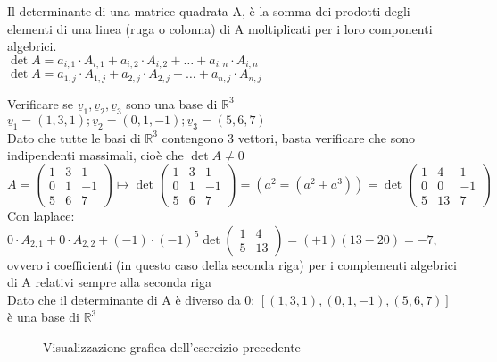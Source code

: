 \begin{teorema}
	Il determinante di una matrice quadrata A, è la somma dei prodotti degli elementi di una linea (ruga o colonna) di A moltiplicati per i loro componenti algebrici.\\
	$\det A=a_{i,1}\cdot A_{i,1}+a_{i,2}\cdot A_{i,2}+\dots+a_{i,n}\cdot A_{i,n}$\\
	$\det A=a_{1,j}\cdot A_{1,j}+a_{2,j}\cdot A_{2,j}+\dots+a_{n,j}\cdot A_{n,j}$
\end{teorema}

\begin{esercizio}
	Verificare se $\underline{v}_1,\underline{v}_2,\underline{v}_3$ sono una base di $\mathbb{R}^3$\\
	$\underline{v}_1=(1,3,1); \underline{v}_2=(0,1,-1); \underline{v}_3=(5,6,7)$\\
	Dato che tutte le basi di $\mathbb{R}^3$ contengono 3 vettori, basta verificare che sono indipendenti massimali, cioè che $\det A\neq 0$\\
	$A=\begin{pmatrix}
		1&3&1\\
		0&1&-1\\
		5&6&7
	\end{pmatrix}\mapsto \det\begin{pmatrix}
		1&3&1\\
		0&1&-1\\
		5&6&7
	\end{pmatrix}=(a^2=(a^2+a^3))=\det\begin{pmatrix}
		1 & 4 & 1\\
		0 & 0 &-1\\
		5 & 13 & 7
	\end{pmatrix}$\\
	Con laplace: $0\cdot A_{2,1}+0\cdot A_{2,2}+(-1)\cdot(-1)^5\det\begin{pmatrix}
		1 &4\\
		5 &13
	\end{pmatrix}=(+1)(13-20)=-7$, ovvero i coefficienti (in questo caso della seconda riga) per i complementi algebrici di A relativi sempre alla seconda riga\\
	Dato che il determinante di A è diverso da 0: $[(1,3,1),(0,1,-1),(5,6,7)]$ è una base di $\mathbb{R}^3$
\end{esercizio}

\begin{figure}[H]
	\centering
	\caption[Caption]{Visualizzazione grafica dell'esercizio precedente}
	\label{fig:laplacees1}
\end{figure}

